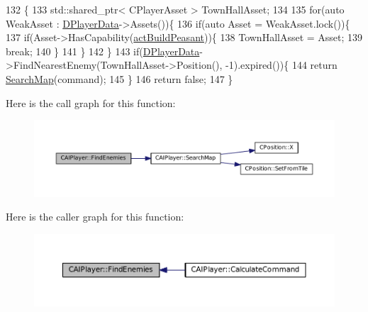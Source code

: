 \begin{DoxyCode}
132                                                          \{
133     std::shared\_ptr< CPlayerAsset > TownHallAsset;
134     
135     \textcolor{keywordflow}{for}(\textcolor{keyword}{auto} WeakAsset : \hyperlink{classCAIPlayer_a83b5113c8f7e80df54940b647c5ee2e6}{DPlayerData}->Assets())\{
136         \textcolor{keywordflow}{if}(\textcolor{keyword}{auto} Asset = WeakAsset.lock())\{
137             \textcolor{keywordflow}{if}(Asset->HasCapability(\hyperlink{GameDataTypes_8h_a35b98ce26aca678b03c6f9f76e4778cea66c601dce0fc095460b3c2c25f66ee71}{actBuildPeasant}))\{
138                 TownHallAsset = Asset;
139                 \textcolor{keywordflow}{break};
140             \}
141         \}
142     \}
143     \textcolor{keywordflow}{if}(\hyperlink{classCAIPlayer_a83b5113c8f7e80df54940b647c5ee2e6}{DPlayerData}->FindNearestEnemy(TownHallAsset->Position(), -1).expired())\{
144         \textcolor{keywordflow}{return} \hyperlink{classCAIPlayer_afafbe8fc589e09a16ae1f02f2794d7b0}{SearchMap}(command);
145     \}
146     \textcolor{keywordflow}{return} \textcolor{keyword}{false};    
147 \}
\end{DoxyCode}
Here is the call graph for this function\+:
\nopagebreak
\begin{figure}[H]
\begin{center}
\leavevmode
\includegraphics[width=350pt]{classCAIPlayer_a33b1533570e7a00114d1b85b3551e395_cgraph}
\end{center}
\end{figure}
Here is the caller graph for this function\+:
\nopagebreak
\begin{figure}[H]
\begin{center}
\leavevmode
\includegraphics[width=350pt]{classCAIPlayer_a33b1533570e7a00114d1b85b3551e395_icgraph}
\end{center}
\end{figure}
\hypertarget{classCAIPlayer_afafbe8fc589e09a16ae1f02f2794d7b0}{}\label{classCAIPlayer_afafbe8fc589e09a16ae1f02f2794d7b0} 

